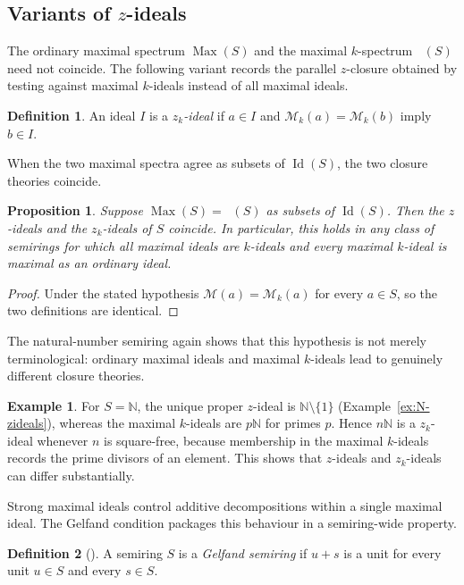 \documentclass[11pt,leqno]{amsart}
\theoremstyle{plain}
\newtheorem{proposition}[theorem]{Proposition}
\theoremstyle{definition}
\newtheorem{definition}{Definition}[section]
\newtheorem{example}[theorem]{Example}
\theoremstyle{remark}
\numberwithin{equation}{section}
\DeclareMathOperator{\Id}{Id}
\DeclareMathOperator{\Max}{Max}
\DeclareMathOperator{\Maxk}{Max_k}
\newcommand{\M}{\mathcal M}
\newcommand{\Mk}{\mathcal M_k}
\newcommand{\N}{\mathds N}
\begin{document}
\subsection{Variants of \texorpdfstring{$z$}{z}-ideals}

The ordinary maximal spectrum $\Max(S)$ and the maximal $k$-spectrum
$\Maxk(S)$ need not coincide.
The following variant records the parallel $z$-closure obtained
by testing against maximal $k$-ideals instead of all maximal ideals.

\begin{definition}\label{def:zk}
An ideal $I$ is a \emph{$z_k$-ideal} if $a\in I$ and $\Mk(a)=\Mk(b)$
imply $b\in I$.
\end{definition}

When the two maximal spectra agree as subsets of $\Id(S)$,
the two closure theories coincide.

\begin{proposition}\label{prop:zk-safe}
Suppose $\Max(S)=\Maxk(S)$ as subsets of $\Id(S)$.
Then the $z$-ideals and the $z_k$-ideals of $S$ coincide.
In particular, this holds in any class of semirings
for which all maximal ideals are $k$-ideals and every
maximal $k$-ideal is maximal as an ordinary ideal.
\end{proposition}
\begin{proof}
Under the stated hypothesis $\M(a)=\Mk(a)$ for every $a\in S$,
so the two definitions are identical.
\end{proof}

The natural-number semiring again shows that this hypothesis is
not merely terminological: ordinary maximal ideals and maximal
$k$-ideals lead to genuinely different closure theories.

\begin{example}\label{ex:zk-N}
For $S=\N$, the unique proper $z$-ideal is $\N\setminus\{1\}$
(Example~\ref{ex:N-zideals}), whereas the maximal $k$-ideals are
$p\N$ for primes $p$.
Hence $n\N$ is a $z_k$-ideal whenever $n$ is square-free,
because membership in the maximal $k$-ideals records the prime
divisors of an element.
This shows that $z$-ideals and $z_k$-ideals can differ substantially.
\end{example}

Strong maximal ideals control additive decompositions within a single
maximal ideal.
The Gelfand condition packages this behaviour in a semiring-wide
property.

\begin{definition}[\cite{Golan/Book}]
A semiring $S$ is a \emph{Gelfand semiring} if $u+s$ is a unit
for every unit $u\in S$ and every $s\in S$.
\end{definition}
\end{document}
